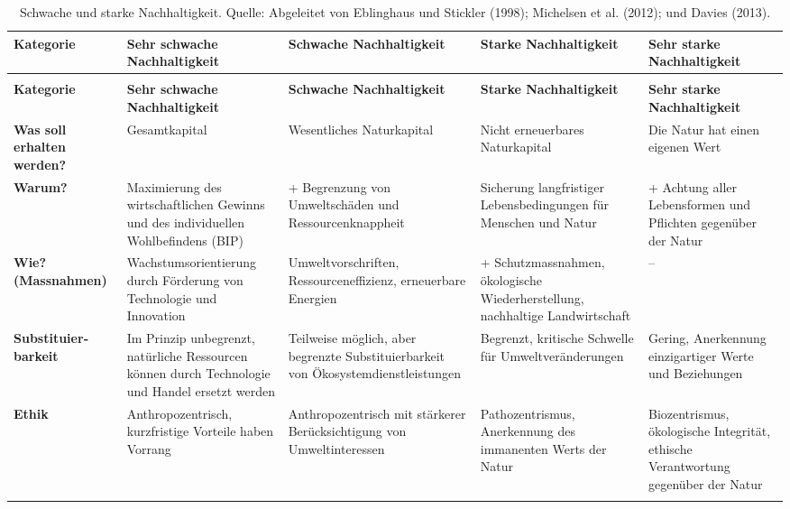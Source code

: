 \documentclass[
  nswissgerman,
  a4paper,
  DIV=11,
  numbers=noendperiod,
  oneside,
  openany]{scrreprt}
\begin{document}
\begin{longtable}[t]{>{\raggedright\arraybackslash}p{1.6cm}>{\raggedright\arraybackslash}p{2.3cm}>{\raggedright\arraybackslash}p{2.3cm}>{\raggedright\arraybackslash}p{2.3cm}>{\raggedright\arraybackslash}p{2.3cm}}

\caption{\label{tbl-weak-strong-sustainability}Schwache und starke
Nachhaltigkeit. Quelle: Abgeleitet von Eblinghaus und Stickler (1998);
{Michelsen et al.} (2012); und Davies (2013).}

\tabularnewline

\toprule
\textbf{Kategorie} & \textbf{Sehr schwache Nachhaltigkeit} & \textbf{Schwache Nachhaltigkeit} & \textbf{Starke Nachhaltigkeit} & \textbf{Sehr starke Nachhaltigkeit}\\
\midrule
\endfirsthead
\multicolumn{5}{@{}l}{\textit{(continued)}}\\
\toprule
\textbf{Kategorie} & \textbf{Sehr schwache Nachhaltigkeit} & \textbf{Schwache Nachhaltigkeit} & \textbf{Starke Nachhaltigkeit} & \textbf{Sehr starke Nachhaltigkeit}\\
\midrule
\endhead

\endfoot
\bottomrule
\endlastfoot
\textbf{Was soll erhalten werden?} & Gesamtkapital & Wesentliches Naturkapital & Nicht erneuerbares Naturkapital & Die Natur hat einen eigenen Wert\\
\textbf{Warum?} & Maximierung des wirtschaftlichen Gewinns und des individuellen Wohlbefindens (BIP) & + Begrenzung von Umweltschäden und Ressourcenknappheit & Sicherung langfristiger Lebensbedingungen für Menschen und Natur & + Achtung aller Lebensformen und Pflichten gegenüber der Natur\\
\textbf{Wie? (Massnahmen)} & Wachstums­orientierung durch Förderung von Technologie und Innovation & Umweltvorschriften, Ressourceneffizienz, erneuerbare Energien & + Schutzmassnahmen, ökologische Wiederherstellung, nachhaltige Landwirtschaft & –\\
\textbf{Substituier­barkeit} & Im Prinzip unbegrenzt, natürliche Ressourcen können durch Technologie und Handel ersetzt werden & Teilweise möglich, aber begrenzte Substituierbarkeit von Ökosystemdienstleistungen & Begrenzt, kritische Schwelle für Umweltveränderungen & Gering, Anerkennung einzigartiger Werte und Beziehungen\\
\textbf{Ethik} & Anthropozentrisch, kurzfristige Vorteile haben Vorrang & Anthropozentrisch mit stärkerer Berücksichtigung von Umweltinteressen & Pathozentrismus, Anerkennung des immanenten Werts der Natur & Biozentrismus, ökologische Integrität, ethische Verantwortung gegenüber der Natur\\*

\end{longtable}
\end{document}
